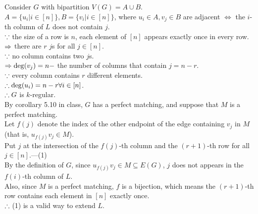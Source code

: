 \setcounter{pr}{5}
\begin{pr}
Consider $G$ with bipartition $V(G)=A\cup B$.\\
$A=\{u_i|i\in[n]\}, B=\{v_i|i\in[n]\}$, where $u_i\in A, v_j\in B$ are adjacent $\iff$ the $i$-th column of $L$ does not contain $j$.\\
$\because$ the size of a row is $n$, each element of $[n]$ appears exactly once in every row.\\
$\Rightarrow$ there are $r$ $j$s for all $j\in[n]$.\\
$\because$ no column contains two $j$s.\\
$\Rightarrow\deg(v_j)=n-$ the number of columns that contain $j=n-r$.\\
$\because$ every column contains $r$ different elements.\\
$\therefore\deg(u_i)=n-r\forall i\in[n]$.\\
$\therefore G$ is $k$-regular.\\
By corollary 5.10 in class, $G$ has a perfect matching, and suppose that $M$ is a perfect matching.\\
Let $f(j)$ denote the index of the other endpoint of the edge containing $v_j$ in $M$ (that is, $u_{f(j)}v_j\in M$).\\
Put $j$ at the intersection of the $f(j)$-th column and the $(r+1)$-th row for all $j\in[n]$.---(1)\\
By the definition of $G$, since $u_{f(j)}v_j\in M\subseteq E(G)$, $j$ does not appears in the $f(i)$-th column of $L$.\\
Also, since $M$ is a perfect matching, $f$ is a bijection, which means the $(r+1)$-th row contains each element in $[n]$ exactly once.\\
$\therefore$ (1) is a valid way to extend $L$.
\end{pr}

